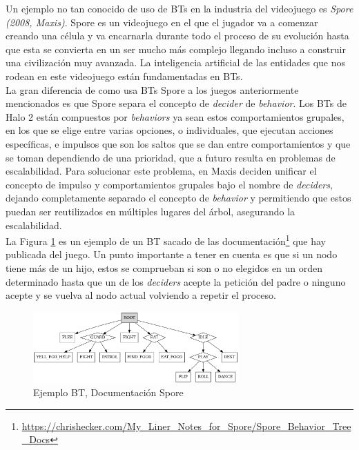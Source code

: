 Un ejemplo no tan conocido de uso de BTs en la industria del videojuego es \textit{Spore (2008, Maxis)}. Spore es un videojuego en el que el jugador va a comenzar creando una célula y va encarnarla durante todo el proceso de su evolución hasta que esta se convierta en un ser mucho más complejo llegando incluso a construir una civilización muy avanzada. La inteligencia artificial de las entidades que nos rodean en este videojuego están fundamentadas en BTs.\\

La gran diferencia de como usa BTs Spore a los juegos anteriormente mencionados es que Spore separa el concepto de \textit{decider} de \textit{behavior}. Los BTs de Halo 2 están compuestos por \textit{behaviors} ya sean estos comportamientos grupales, en los que se elige entre varias opciones, o individuales, que ejecutan acciones específicas, e impulsos que son los saltos que se dan entre comportamientos y que se toman dependiendo de una prioridad, que a futuro resulta en problemas de escalabilidad. Para solucionar este problema, en Maxis deciden unificar el concepto de impulso y comportamientos grupales bajo el nombre de \textit{deciders}, dejando completamente separado el concepto de \textit{behavior} y permitiendo que estos puedan ser reutilizados en múltiples lugares del árbol, asegurando la escalabilidad.\\

La Figura \ref{fig:BT Spore} es un ejemplo de un BT sacado de las documentación\footnote{ \url{https://chrishecker.com/My_Liner_Notes_for_Spore/Spore_Behavior_Tree_Docs}} que hay publicada del juego.
Un punto importante a tener en cuenta es que si un nodo tiene más de un hijo, estos se comprueban si son o no elegidos en un orden determinado hasta que un de los \textit{deciders} acepte la petición del padre o ninguno acepte y se vuelva al nodo actual volviendo a repetir el proceso.\\

\begin{figure}[t]
	\centering
	\includegraphics[width = 0.7\textwidth]{Imagenes/BT_Spoore.png}
	\caption{Ejemplo BT, Documentación Spore}
	\label{fig:BT Spore}
\end{figure}
